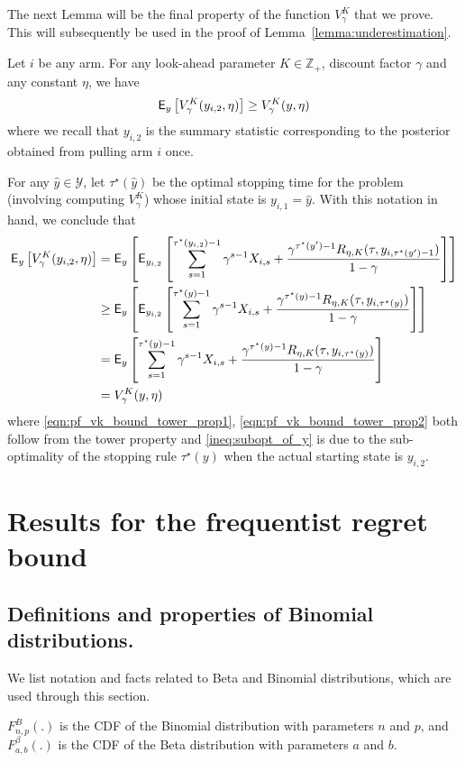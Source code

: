 The next Lemma will be the final property of the function $V^K_\gamma$ that we prove. This will subsequently be used in the proof of Lemma~\ref{lemma:underestimation}.
\begin{lemma} \label{lemma:vk_bound}
	Let $i$ be any arm. For any look-ahead parameter $K \in \mathbb{Z}_+$, discount factor $\gamma$ and any constant $\eta$, we have
	\begin{equation*}
	\mathsf{E}_y\left[V^K_\gamma(y_{i,2}, \eta) \right] \ge V^K_\gamma(y, \eta)
	\end{equation*}
	where we recall that $y_{i,2}$ is the summary statistic corresponding to the posterior obtained from pulling arm $i$ once.
\end{lemma}
\begin{myproof}[Proof.]
	For any $\hat y \in \mathcal{Y}$, let $\tau^\star(\hat y)$ be the optimal stopping time for the problem (involving computing $V^K_\gamma$) whose initial state is $y_{i,1} = \hat y$. With this notation in hand, we conclude that
	\begin{align}
	\mathsf{E}_y \left[V^K_\gamma(y_{i,2}, \eta) \right] & = \mathsf{E}_y\left[\mathsf{E}_{y_{i,2}}\left[\sum_{s=1}^{\tau^\star(y_{i,2})-1} \gamma^{s-1} X_{i,s} + \frac{\gamma^{\tau^\star(y')-1} R_{\eta, K}(\tau, y_{i,\tau^\star(y')-1})}{1-\gamma} \right]\right]\label{eqn:pf_vk_bound_tower_prop1}  \\
	& \ge  \mathsf{E}_y\left[\mathsf{E}_{y_{i,2}}\left[\sum_{s=1}^{\tau^\star(y)-1} \gamma^{s-1} X_{i,s} + \frac{\gamma^{\tau^\star(y)-1} R_{\eta, K}(\tau, y_{i,\tau^\star(y)})}{1-\gamma}\right] \right] \label{ineq:subopt_of_y}\\
	& = \mathsf{E}_y\left[\sum_{s=1}^{\tau^\star(y)-1} \gamma^{s-1} X_{i,s} + \frac{\gamma^{\tau^\star(y)-1} R_{\eta, K}(\tau, y_{i,\tau^\star(y)})}{1-\gamma}\right] \label{eqn:pf_vk_bound_tower_prop2} \\
	& = V^K_\gamma(y, \eta) \nonumber
	\end{align}
	where \eqref{eqn:pf_vk_bound_tower_prop1}, \eqref{eqn:pf_vk_bound_tower_prop2} both follow from the tower property and \eqref{ineq:subopt_of_y} is due to the sub-optimality of the stopping rule $\tau^\star(y)$ when the actual starting state is $y_{i,2}$.
\end{myproof}


\section{Results for the frequentist regret bound}
\subsection{Definitions and properties of Binomial distributions.}
We list notation and facts related to Beta and Binomial distributions, which are used through this section.
\begin{definition}
	$F^B_{n,p}(.)$ is the CDF of the Binomial distribution with parameters $n$ and $p$, and $F^\beta_{a,b}(.)$ is the CDF of the Beta distribution with parameters $a$ and $b$.
\end{definition}

